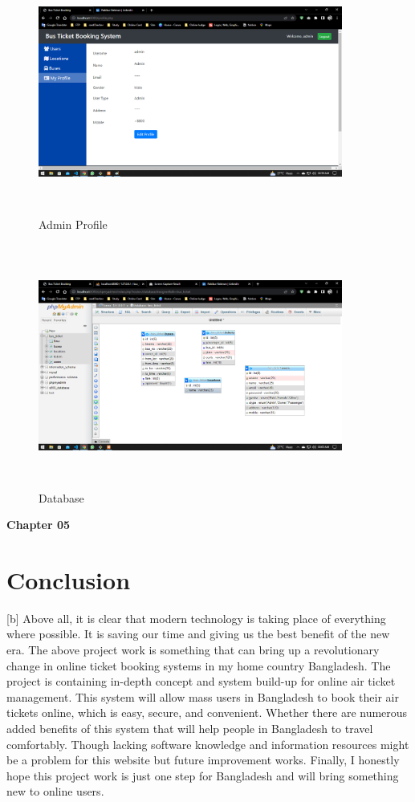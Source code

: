 \documentclass{article}
\begin{document}
\begin{figure}[h]
    \centering
  \includegraphics[width=10cm,height=8cm]{img/admin profile view.png}
    \caption{Admin Profile}
    \label{fig:my_label}
\end{figure}
\newpage
\begin{figure}[h]
    \centering
    \includegraphics[width=10cm,height=8cm]{img/database.png}
    \caption{Database}
    \label{fig:my_label}
\end{figure}
\newpage
\begin{center}
 \huge \textbf{Chapter 05}
\end{center}
\section{Conclusion}[b]
Above all, it is clear that modern technology is taking place of everything where possible. It is saving our time and giving us the best benefit of the new era. The above project work is something that can bring up a revolutionary change in online ticket booking systems in my home country Bangladesh. The project is containing in-depth concept and system build-up for online air ticket management. This system will allow mass users in Bangladesh to book their air tickets online, which is easy, secure, and convenient. Whether there are numerous added benefits of this system that will help people in Bangladesh to travel comfortably. Though lacking software knowledge and information resources might be a problem for this website but future improvement works. Finally, I honestly hope this project work is just one step for Bangladesh and will bring something new to online users.
\newpage
\newpage
\end{document}
